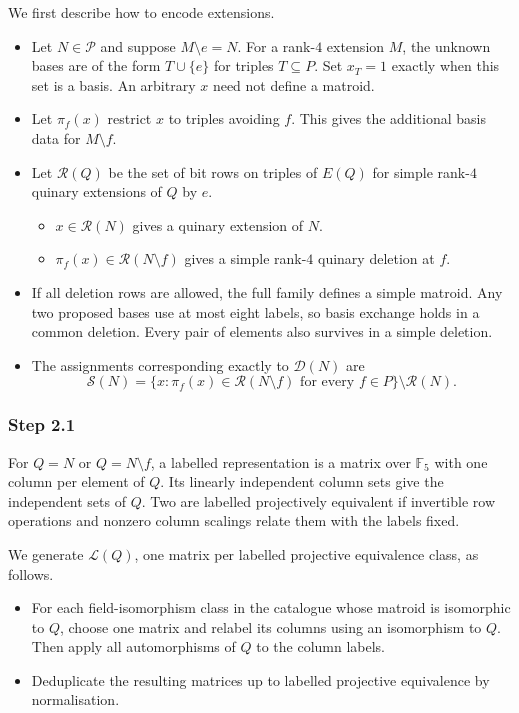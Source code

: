 \documentclass{beamer}
\newcommand{\F}{\mathbb{F}}
\newcommand{\RR}{\mathcal R}
\begin{document}
\begin{frame}
  We first describe how to encode extensions.
  \begin{itemize}
    \item Let $N\in\mathcal P$ and suppose $M\setminus e=N$. For a rank-$4$
      extension $M$, the unknown bases are of the form $T\cup\{e\}$
      for triples $T\subseteq P$. Set $x_T=1$ exactly when this set
      is a basis. An arbitrary $x$ need not define a matroid.
    \item Let $\pi_f(x)$ restrict $x$ to triples avoiding $f$. This
      gives the additional basis data for $M\setminus f$.
    \item Let $\RR(Q)$ be the set of bit rows on triples of $E(Q)$
      for simple rank-$4$ quinary extensions of $Q$ by $e$.
      \begin{itemize}
        \item $x\in\RR(N)$ gives a quinary extension of $N$.
        \item $\pi_f(x)\in\RR(N\setminus f)$ gives a simple rank-$4$
          quinary deletion at $f$.
      \end{itemize}
    \item If all deletion rows are allowed, the full family defines a
      simple matroid. Any two proposed bases use at most eight labels,
      so basis exchange holds in a common deletion. Every pair of
      elements also survives in a simple deletion.
    \item The assignments corresponding exactly to $\mathcal D(N)$ are
      \[
        \mathcal S(N)=
        \{x:\pi_f(x)\in\RR(N\setminus f)\text{ for every }f\in P\}
        \setminus\RR(N).
      \]
  \end{itemize}
\end{frame}
\begin{frame}
  \frametitle{Step 2.1}
  For $Q=N$ or $Q=N\setminus f$, a labelled representation is a
  matrix over $\F_5$ with one column per element of $Q$. Its linearly
  independent column sets give the independent sets of $Q$. Two are labelled
  projectively equivalent if invertible row operations and nonzero
  column scalings relate them with the labels fixed.

  We generate $\mathcal L(Q)$, one matrix per labelled projective
  equivalence class, as follows.
  \begin{itemize}
    \item For each field-isomorphism class in the catalogue whose matroid
      is isomorphic to $Q$, choose one matrix and relabel its columns
      using an isomorphism to $Q$. Then apply all automorphisms of $Q$
      to the column labels.
    \item Deduplicate the resulting matrices up to labelled projective
      equivalence by normalisation.
  \end{itemize}
\end{frame}
\end{document}
